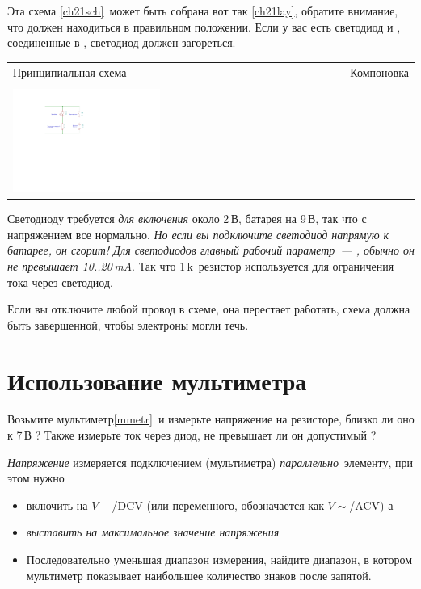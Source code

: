\bigskip

Эта схема \ref{ch21sch}\ может быть собрана вот так \ref{ch21lay}, обратите
внимание, что  должен находиться в правильном положении. Если у
вас есть светодиод и , соединенные в ,
светодиод должен загореться.

\bigskip
\noindent\begin{tabular}{p{} p{}}
Принципиальная схема \label{ch21sch}
&
Компоновка \label{ch21lay} \\
&\\
\includegraphics[width=0.45\textwidth]{bcollis/led1/led1.pdf}
&
\\
\end{tabular}

\bigskip
Светодиоду требуется \emph{для включения} около 2\,В, батарея на
9\,В, так что с напряжением все нормально.
\emph{Но если вы подключите светодиод напрямую к батарее, 
он сгорит! Для светодиодов главный рабочий параметр\ --- , обычно он не превышает 10..20\,mA}. Так что 1\,k\ резистор
используется для ограничения тока через светодиод.

\bigskip
Если вы отключите любой провод в схеме, она перестает работать, схема должна
быть завершенной, чтобы электроны могли течь.

\section{Использование мультиметра}

Возьмите мультиметр\ref{mmetr}\ и измерьте напряжение на резисторе, близко ли
оно к 7\,В ? Также измерьте ток через диод, не превышает ли он допустимый ?

\begin{framed}
\emph{Напряжение} измеряется  подключением
 (мультиметра) \emph{параллельно}\ элементу, при этом нужно
\begin{itemize}
\item
{} включить на
 $V-$/DCV (или переменного,
обозначается как $V\sim$/ACV) а
  \item {} \emph{выставить на максимальное значение напряжения}
\item 
Последовательно уменьшая диапазон измерения, найдите диапазон, в котором
мультиметр показывает наибольшее количество знаков после запятой. 
\end{itemize}
\end{framed}

